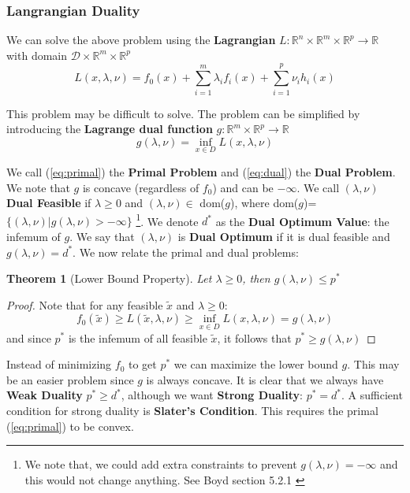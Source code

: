 \documentclass[]{article}
\theoremstyle{mattstyle}
\newtheorem{theorem}{Theorem}[section]
\theoremstyle{definition}
\begin{document}
\subsubsection{Langrangian Duality}
We can solve the above problem using the \textbf{Lagrangian} $L: \mathbb{R}^n\times \mathbb{R}^m\times \mathbb{R}^p \rightarrow \mathbb{R} $ with domain $\mathcal{D}\times\mathbb{R}^m\times \mathbb{R}^p$
\begin{equation}\label{eq:primal}
L(x,\lambda,\nu) = f_0(x) + \sum_{i=1}^m \lambda_if_i(x) + \sum_{i=1}^p \nu_i h_i(x)
\end{equation}

This problem may be difficult to solve. The problem can be simplified by introducing the \textbf{Lagrange dual function} $g: \mathbb{R}^m\times \mathbb{R}^p \rightarrow \mathbb{R}$
\begin{equation}\label{eq:dual}
g(\lambda,\nu) =\inf\limits_{x\in D} L(x,\lambda,\nu)
\end{equation}

We call (\ref{eq:primal}) the \textbf{Primal Problem} and (\ref{eq:dual}) the \textbf{Dual Problem}. We note that $g$ is concave (regardless of $f_0$) and can be $-\infty$. We call $(\lambda, \nu)$ \textbf{Dual Feasible} if $\lambda \ge 0$ and $(\lambda, \nu) \in$ dom($g$), where dom($g$)=$\{ (\lambda, \nu) | g(\lambda, \nu)>-\infty\}$ \footnote{We note that, we could add extra constraints to prevent $g(\lambda, \nu)=-\infty$ and this would not change anything. See Boyd section 5.2.1 \cite{Boyd:2004:CO:993483}}. We denote $d^*$ as the \textbf{Dual Optimum Value}: the infemum of $g$. We say that $(\lambda,\nu)$ is \textbf{Dual Optimum} if it is dual feasible and $g(\lambda,\nu)=d^*$. We now relate the primal and dual problems:
\begin{theorem}[Lower Bound Property]
	Let $\lambda \ge 0$, then $g(\lambda, \nu) \le p^*$ 
\end{theorem}
\begin{proof}
	Note that for any feasible $\tilde{x}$ and $\lambda \ge 0$:
	$$f_0(\tilde{x}) \ge L(\tilde{x}, \lambda, \nu) \ge \inf\limits_{x\in D} L(x,\lambda,\nu) = g(\lambda, \nu)$$
	and since $p^*$ is the infemum of all feasible $\tilde{x}$, it follows that $ p^* \ge g(\lambda, \nu)$
\end{proof}

Instead of minimizing $f_0$ to get $p^*$ we can maximize the lower bound $g$. This may be an easier problem since $g$ is always concave. It is clear that we always have \textbf{Weak Duality} $p^* \ge d^*$, although we want \textbf{Strong Duality}: $p^* = d^*$. A sufficient condition for strong duality is \textbf{Slater's Condition}. This requires the primal (\ref{eq:primal}) to be convex.
\end{document}
